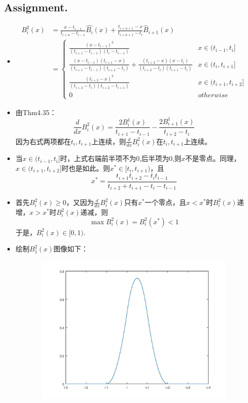 \documentclass[a4paper,11.5pt,UTF8]{ctexart}
\begin{document}
\begin{large}
\subsection{Assignment.\uppercase\expandafter{}}
\begin{itemize}
	\item[(a)] \begin{align*}
		B_i^2(x) &= \frac{x-t_{i-1}}{t_{i+n}-t_{i-1}}\hat{B_i}(x)+\frac{t_{i+n+1}-x}{t_{i+n+1}-t_{i}}\hat{B}_{i+1}(x) \\
		&= \begin{cases}
			\frac{(x-t_{i-1})^2}{(t_{i+1}-t_{i-1})(t_i-t_{i-1})} & x\in(t_{i-1},t_i] \\
			\frac{(x-t_{i-1})(t_{i+1}-x)}{(t_{i+1}-t_{i-1})(t_{i+1}-t_{i})}+\frac{(t_{i+2}-x)(x-t_{i})}{(t_{i+2}-t_{i})(t_{i+1}-t_{i})} & x\in (t_i,t_{i+1}] \\
			\frac{(t_{i+2}-x)^2}{(t_{i+2}-t_{i})(t_{i+2}-t_{i+1})} & x\in (t_{i+1},t_{i+2}]\\ 
			0 & otherwise
		\end{cases}
	\end{align*}
	\item[(b)] 由Thm4.35：
	$$\frac{d}{dx}B_i^2(x)=\frac{2B_i^1(x)}{t_{i+1}-t_{i-1}}-\frac{2B_{i+1}^1(x)}{t_{i+2}-t_{i}}$$ 因为右式两项都在$t_i,t_{i+1}$上连续，则$\frac{d}{dx}B_i^2(x)$在$t_i,t_{i+1}$上连续。
	\item[(c)] 当$x\in (t_{i-1},t_i]$时，上式右端前半项不为0,后半项为0,则$x$不是零点。同理，$x\in(t_{i+1},t_{i+2}]$时也是如此。则$x^*\in[t_i,t_{i+1})$，且
	$$x^*=\frac{t_{i+1}t_{i+2}-t_it_{i-1}}{t_{i+2}+t_{i+1}-t_i-t_{i-1}}$$
	\item[(d)] 首先$B_i^2(x)\geqslant 0$，又因为$\frac{d}{dx}B_i^2(x)$只有$x^*$一个零点，且$x<x^*$时$B_i^2(x)$递增，$x>x^*$时$B_i^2(x)$递减，则$$\max B_i^2(x)=B_i^2(x^*)<1$$
	于是，$B_i^2(x)\in [0,1)$.
	\item[(e)] 绘制$B_1^2(x)$图像如下：
	\begin{figure}[b]
		\centering
		\includegraphics[width=15cm,height=7.4cm]{plot.jpg}
	\end{figure}
\end{itemize}


\end{large}
\end{document}

